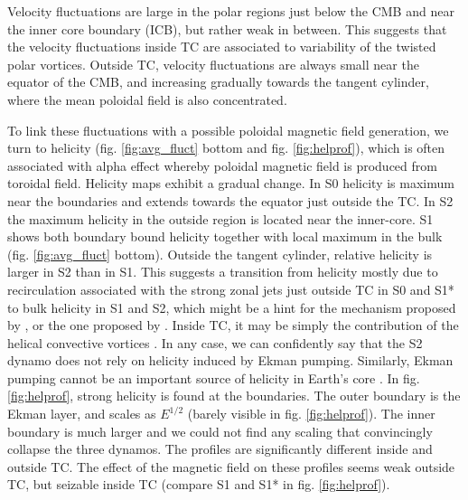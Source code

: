 \documentclass[12pt, a4paper]{article}
\begin{document}


Velocity fluctuations are large in the polar regions just below the CMB and near the inner core boundary (ICB), but rather weak in between.
This suggests that the velocity fluctuations inside TC are associated to variability of the twisted polar vortices.
Outside TC, velocity fluctuations are always small near the equator of the CMB, and increasing gradually towards the tangent cylinder, where the mean poloidal field is also concentrated.

To link these fluctuations with a possible poloidal magnetic field generation, we turn to helicity (fig. \ref{fig:avg_fluct} bottom and fig. \ref{fig:helprof}), which is often associated with alpha effect \citep[e.g.][]{moffatt1978,jones2008lecture} whereby poloidal magnetic field is produced from toroidal field.
Helicity maps exhibit a gradual change.
In S0 helicity is maximum near the boundaries and extends towards the equator just outside the TC.
In S2 the maximum helicity in the outside region is located near the inner-core.
S1 shows both boundary bound helicity together with local maximum in the bulk (fig. \ref{fig:avg_fluct} bottom).
Outside the tangent cylinder, relative helicity is larger in S2 than in S1.
This suggests a transition from helicity mostly due to recirculation associated with the strong zonal jets just outside TC in S0 and S1* \citep[see][]{busse1975} to bulk helicity in S1 and S2, which might be a hint for the mechanism proposed by \citet[relying on magnetic pumping]{sreenivasan2011}, or the one proposed by \citet[relying on inertial waves]{davidson2014}.
Inside TC, it may be simply the contribution of the helical convective vortices \citep[see e.g.][]{aurnou2003,grooms2010}.
In any case, we can confidently say that the S2 dynamo does not rely on helicity induced by Ekman pumping.
Similarly, Ekman pumping cannot be an important source of helicity in Earth's core \citep[e.g.][]{schaeffer2006}.
In fig. \ref{fig:helprof}, strong helicity is found at the boundaries.
The outer boundary is the Ekman layer, and scales as $E^{1/2}$ (barely visible in fig. \ref{fig:helprof}).
The inner boundary is much larger and we could not find any scaling that convincingly collapse the three dynamos.
The profiles are significantly different inside and outside TC.
The effect of the magnetic field on these profiles seems weak outside TC, but seizable inside TC (compare S1 and S1* in fig. \ref{fig:helprof}).
\end{document}
